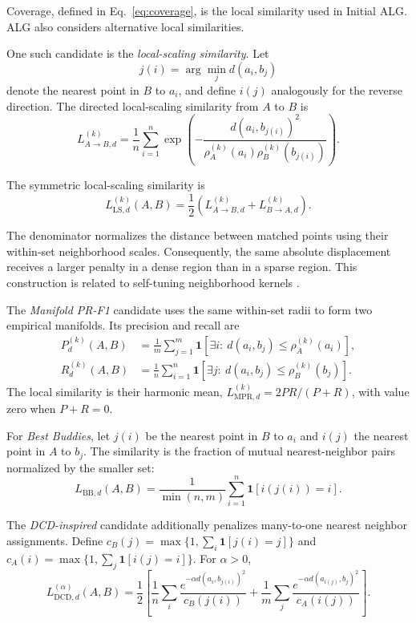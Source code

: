 \documentclass[preprint,12pt]{elsarticle}
\newcommand{\ind}{\mathbf{1}}
\begin{document}
Coverage, defined in Eq.~\eqref{eq:coverage}, is the local similarity used in
Initial ALG. ALG also considers alternative local similarities.

One such candidate is the \emph{local-scaling similarity}. Let
\[
j(i)=\arg\min_j d(a_i,b_j)
\]
denote the nearest point in $B$ to $a_i$, and define $i(j)$ analogously for
the reverse direction. The directed local-scaling similarity from $A$ to $B$
is
\begin{equation}
L_{A\to B,d}^{(k)}
=
\frac{1}{n}
\sum_{i=1}^{n}
\exp\!\left(
-\frac{
d(a_i,b_{j(i)})^2
}{
\rho_A^{(k)}(a_i)
\rho_B^{(k)}(b_{j(i)})
}
\right).
\label{eq:local-directed}
\end{equation}

The symmetric local-scaling similarity is
\begin{equation}
L_{\mathrm{LS},d}^{(k)}(A,B)
=
\frac{1}{2}
\left(
L_{A\to B,d}^{(k)}
+
L_{B\to A,d}^{(k)}
\right).
\label{eq:local-scaling}
\end{equation}

The denominator normalizes the distance between matched points using their
within-set neighborhood scales. Consequently, the same absolute displacement
receives a larger penalty in a dense region than in a sparse region. This
construction is related to self-tuning neighborhood kernels
\cite{zelnikmanor2004selftuning}.

The \emph{Manifold PR-F1} candidate uses the same within-set radii to form two
empirical manifolds. Its precision and recall are
\begin{align}
P_d^{(k)}(A,B)
&=\frac{1}{m}\sum_{j=1}^{m}
\ind\!\left[\exists i:\ d(a_i,b_j)\leq\rho_A^{(k)}(a_i)\right],\\
R_d^{(k)}(A,B)
&=\frac{1}{n}\sum_{i=1}^{n}
\ind\!\left[\exists j:\ d(a_i,b_j)\leq\rho_B^{(k)}(b_j)\right].
\end{align}
The local similarity is their harmonic mean,
$L_{\mathrm{MPR},d}^{(k)}=2PR/(P+R)$, with value zero when $P+R=0$.

For \emph{Best Buddies}, let $j(i)$ be the nearest point in $B$ to $a_i$ and
$i(j)$ the nearest point in $A$ to $b_j$. The similarity is the fraction of
mutual nearest-neighbor pairs normalized by the smaller set:
\begin{equation}
L_{\mathrm{BB},d}(A,B)=
\frac{1}{\min(n,m)}\sum_{i=1}^{n}\ind[i(j(i))=i].
\end{equation}

The \emph{DCD-inspired} candidate additionally penalizes many-to-one nearest
neighbor assignments. Define
$c_B(j)=\max\{1,\sum_i\ind[j(i)=j]\}$ and
$c_A(i)=\max\{1,\sum_j\ind[i(j)=i]\}$. For $\alpha>0$,
\begin{equation}
L_{\mathrm{DCD},d}^{(\alpha)}(A,B)=\frac{1}{2}
\left[
\frac{1}{n}\sum_i\frac{e^{-\alpha d(a_i,b_{j(i)})^2}}{c_B(j(i))}
+
\frac{1}{m}\sum_j\frac{e^{-\alpha d(a_{i(j)},b_j)^2}}{c_A(i(j))}
\right].
\end{equation}
\end{document}
